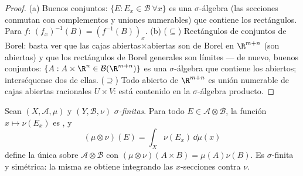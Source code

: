 \begin{proof}
(a) Buenos conjuntos: $\{E : E_x \in \mathcal B\ \forall x\}$ es una
$\sigma$-álgebra (las secciones conmutan con complementos y uniones
numerables) que contiene los rectángulos. Para $f$:
$(f_x)^{-1}(B) = (f^{-1}(B))_x$.
(b) ($\subseteq$) Rectángulos de conjuntos de Borel: basta ver que las
cajas abiertas$\times$abiertas son de Borel en $\R^{m+n}$ (son abiertas)
y que los rectángulos de Borel generales son límites --- de nuevo,
buenos conjuntos: $\{A : A\times\R^n \in \mathcal B(\R^{m+n})\}$ es una
$\sigma$-álgebra que contiene los abiertos; interséquense dos de ellas.
($\supseteq$) Todo abierto de
$\R^{m+n}$ es unión numerable de cajas abiertas racionales $U\times V$:
está contenido en la $\sigma$-álgebra producto.
\end{proof}

\begin{theorem}\label{thm:b3:product:existence}
Sean $(X, \mathcal A, \mu)$ y $(Y, \mathcal B, \nu)$
\emph{$\sigma$-finitas}. Para todo $E \in \mathcal
A\otimes\mathcal B$, la función $x \mapsto \nu(E_x)$ es
, y
\[
(\mu\otimes\nu)(E) = \int_X \nu(E_x)\,\dd\mu(x)
\]
define la única  sobre
$\mathcal A\otimes\mathcal B$ con
$(\mu\otimes\nu)(A\times B) = \mu(A)\nu(B)$. Es $\sigma$-finita y
simétrica: la misma  se obtiene
integrando las $x$-secciones contra $\nu$.
\end{theorem}


